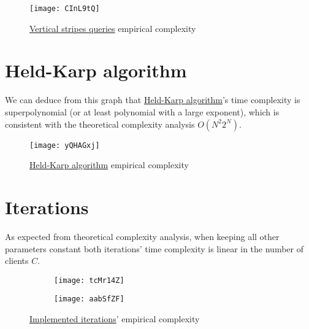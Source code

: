 \begin{figure}[H]
    \centering
    \texttt{[image: CInL9tQ]}
    \caption{\hyperref[algorithm-vstripes]{Vertical stripes queries} empirical complexity}
\end{figure}

\section{Held-Karp algorithm}

We can deduce from this graph that \hyperref[algorithm-tsp-heldkarp]{Held-Karp algorithm}'s time complexity is superpolynomial (or at least polynomial with a large exponent), which is consistent with the theoretical complexity analysis $O(N^2 2^N)$.

\begin{figure}[H]
    \centering
    \texttt{[image: yQHAGxj]}
    \caption{\hyperref[algorithm-tsp-heldkarp]{Held-Karp algorithm} empirical complexity}
\end{figure}
\pagebreak

\section{Iterations}
As expected from theoretical complexity analysis, when keeping all other parameters constant both iterations' time complexity is linear in the number of clients $C$.

\begin{figure}[H]
    \centering
    \begin{subfigure}{0.49\textwidth}
        \centering
        \texttt{[image: tcMr14Z]}
    \end{subfigure}
    \begin{subfigure}{0.49\textwidth}
        \centering
        \texttt{[image: aabSfZF]}
    \end{subfigure}
    \caption{\hyperref[iterations]{Implemented iterations}' empirical complexity}
\end{figure}
